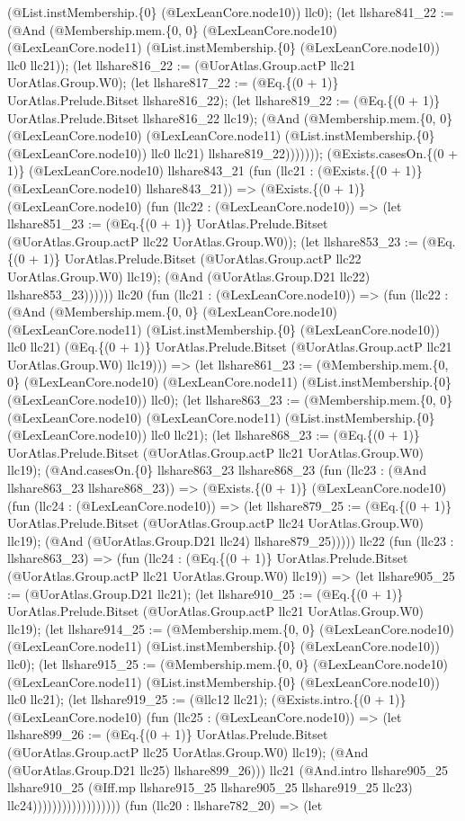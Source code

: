 \documentclass[11pt]{article}
\begin{document}
(@List.instMembership.\{0\} (@LexLeanCore.node10)) llc0); (let llshare841\_22 := (@And (@Membership.mem.\{0, 0\} (@LexLeanCore.node10) (@LexLeanCore.node11) (@List.instMembership.\{0\} (@LexLeanCore.node10)) llc0 llc21)); (let llshare816\_22 := (@UorAtlas.Group.actP llc21 UorAtlas.Group.W0); (let llshare817\_22 := (@Eq.\{(0 + 1)\} UorAtlas.Prelude.Bitset llshare816\_22); (let llshare819\_22 := (@Eq.\{(0 + 1)\} UorAtlas.Prelude.Bitset llshare816\_22 llc19); (@And (@Membership.mem.\{0, 0\} (@LexLeanCore.node10) (@LexLeanCore.node11) (@List.instMembership.\{0\} (@LexLeanCore.node10)) llc0 llc21) llshare819\_22))))))); (@Exists.casesOn.\{(0 + 1)\} (@LexLeanCore.node10) llshare843\_21 (fun (llc21 : (@Exists.\{(0 + 1)\} (@LexLeanCore.node10) llshare843\_21)) => (@Exists.\{(0 + 1)\} (@LexLeanCore.node10) (fun (llc22 : (@LexLeanCore.node10)) => (let llshare851\_23 := (@Eq.\{(0 + 1)\} UorAtlas.Prelude.Bitset (@UorAtlas.Group.actP llc22 UorAtlas.Group.W0)); (let llshare853\_23 := (@Eq.\{(0 + 1)\} UorAtlas.Prelude.Bitset (@UorAtlas.Group.actP llc22 UorAtlas.Group.W0) llc19); (@And (@UorAtlas.Group.D21 llc22) llshare853\_23)))))) llc20 (fun (llc21 : (@LexLeanCore.node10)) => (fun (llc22 : (@And (@Membership.mem.\{0, 0\} (@LexLeanCore.node10) (@LexLeanCore.node11) (@List.instMembership.\{0\} (@LexLeanCore.node10)) llc0 llc21) (@Eq.\{(0 + 1)\} UorAtlas.Prelude.Bitset (@UorAtlas.Group.actP llc21 UorAtlas.Group.W0) llc19))) => (let llshare861\_23 := (@Membership.mem.\{0, 0\} (@LexLeanCore.node10) (@LexLeanCore.node11) (@List.instMembership.\{0\} (@LexLeanCore.node10)) llc0); (let llshare863\_23 := (@Membership.mem.\{0, 0\} (@LexLeanCore.node10) (@LexLeanCore.node11) (@List.instMembership.\{0\} (@LexLeanCore.node10)) llc0 llc21); (let llshare868\_23 := (@Eq.\{(0 + 1)\} UorAtlas.Prelude.Bitset (@UorAtlas.Group.actP llc21 UorAtlas.Group.W0) llc19); (@And.casesOn.\{0\} llshare863\_23 llshare868\_23 (fun (llc23 : (@And llshare863\_23 llshare868\_23)) => (@Exists.\{(0 + 1)\} (@LexLeanCore.node10) (fun (llc24 : (@LexLeanCore.node10)) => (let llshare879\_25 := (@Eq.\{(0 + 1)\} UorAtlas.Prelude.Bitset (@UorAtlas.Group.actP llc24 UorAtlas.Group.W0) llc19); (@And (@UorAtlas.Group.D21 llc24) llshare879\_25))))) llc22 (fun (llc23 : llshare863\_23) => (fun (llc24 : (@Eq.\{(0 + 1)\} UorAtlas.Prelude.Bitset (@UorAtlas.Group.actP llc21 UorAtlas.Group.W0) llc19)) => (let llshare905\_25 := (@UorAtlas.Group.D21 llc21); (let llshare910\_25 := (@Eq.\{(0 + 1)\} UorAtlas.Prelude.Bitset (@UorAtlas.Group.actP llc21 UorAtlas.Group.W0) llc19); (let llshare914\_25 := (@Membership.mem.\{0, 0\} (@LexLeanCore.node10) (@LexLeanCore.node11) (@List.instMembership.\{0\} (@LexLeanCore.node10)) llc0); (let llshare915\_25 := (@Membership.mem.\{0, 0\} (@LexLeanCore.node10) (@LexLeanCore.node11) (@List.instMembership.\{0\} (@LexLeanCore.node10)) llc0 llc21); (let llshare919\_25 := (@llc12 llc21); (@Exists.intro.\{(0 + 1)\} (@LexLeanCore.node10) (fun (llc25 : (@LexLeanCore.node10)) => (let llshare899\_26 := (@Eq.\{(0 + 1)\} UorAtlas.Prelude.Bitset (@UorAtlas.Group.actP llc25 UorAtlas.Group.W0) llc19); (@And (@UorAtlas.Group.D21 llc25) llshare899\_26))) llc21 (@And.intro llshare905\_25 llshare910\_25 (@Iff.mp llshare915\_25 llshare905\_25 llshare919\_25 llc23) llc24)))))))))))))))))) (fun (llc20 : llshare782\_20) => (let 
\end{document}
